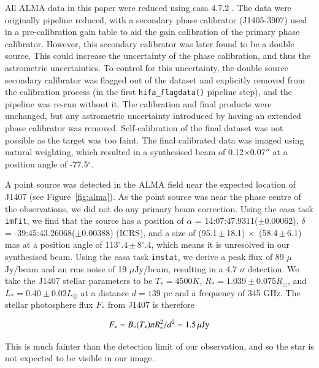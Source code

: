 \documentclass{aa} %
\begin{document}
All ALMA data in this paper were reduced using {\sc casa} 4.7.2 \citep{McMUllin07}.
%
The data were originally pipeline reduced, with a secondary phase calibrator (J1405-3907) used in a pre-calibration gain table to aid the gain calibration of the primary phase calibrator.
%
However, this secondary calibrator was later found to be a double source.
%
This could increase the uncertainty of the phase calibration, and thus the astrometric uncertainties.
%
To control for this uncertainty, the double source secondary calibrator was flagged out of the dataset and explicitly removed from the calibration process (in the first \texttt{hifa\_flagdata()} pipeline step), and the pipeline was re-run without it.
%
The calibration and final products were unchanged, but any astrometric uncertainty introduced by having an extended phase calibrator was removed.
%
Self-calibration of the final dataset was not possible as the target was too faint.
%
The final calibrated data was imaged using natural weighting, which resulted in a synthesised beam of 0.12$\times$0.07$''$ at a position angle of -77.5$^\circ$.
%

A point source was detected in the ALMA field near the expected location of J1407 (see Figure~\ref{fig:alma}).
%
As the point source was near the phase centre of the observations, we did not do any primary beam correction.
%
Using the {\sc casa} task \texttt{imfit}, we find that the source has a position of $\alpha$ = 14:07:47.9311($\pm$0.00062), $\delta$ = -39:45:43.26068($\pm$0\arcsec.00388) (ICRS), and a size of (95.1\,$\pm$\,18.1) $\times$\, (58.4\,$\pm$\,6.1)\,mas at a position angle of 113$^{\circ}$.4\,$\pm$\,8$^{\circ}$.4, which means it is unresolved in our synthesised beam.
%
Using the {\sc casa} task \texttt{imstat}, we derive a peak flux of 89 $\mu$Jy/beam and an rms noise of 19 $\mu$Jy/beam, resulting in a 4.7 $\sigma$ detection.
%
We take the J1407 stellar parameters to be $T_* = 4500 K$, $R_* = 1.039\pm 0.075 R_\odot$, and $L_* = 0.40\pm0.02 L_\odot$ at a distance $d = 139$ pc and a frequency of 345 GHz.
%
The stellar photosphere flux $F_*$ from J1407 is therefore  

    $$F_* = B_\nu(T_*) \pi R_*^2/d^2 = 1.5\,{\rm \mu Jy}$$
    
This is much fainter than the detection limit of our observation, and so the star is not expected to be visible in our image.
\end{document}
